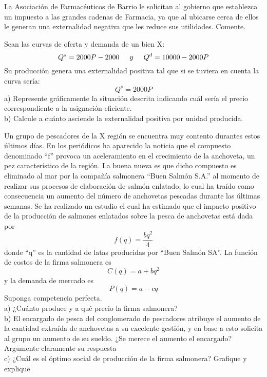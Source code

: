 \documentclass[addpoints,answers]{exam}
\begin{document}
\begin{questions}

\question La Asociación de Farmacéuticos de Barrio le solicitan al gobierno que establezca un impuesto
a las grandes cadenas de Farmacia, ya que al ubicarse cerca de ellos le generan una externalidad
negativa que les reduce sus utilidades. Comente.


\question Sean las curvas de oferta y demanda de un bien X:
\[Q^{s} = 2000P - 2000 \hspace{0.5cm}  y \hspace{0.5cm} Q^{d} = 10000 - 2000P\] \hfill \break
Su producción genera una externalidad positiva tal que si se tuviera en cuenta la curva sería: 
\hspace{0.5cm} \[Q^{s} = 2000P\] \hfill \break
a) Represente gráficamente la situación descrita indicando cuál sería el precio
correspondiente a la asignación eficiente.
\\
b) Calcule a cuánto asciende la externalidad positiva por unidad producida.


\question Un grupo de pescadores de la X región se encuentra muy contento durantes estos
últimos días. En los periódicos ha aparecido la noticia que el compuesto denominado
“f” provoca un aceleramiento en el crecimiento de la anchoveta, un pez característico
de la región. La buena nueva es que dicho compuesto es eliminado al mar por la
compañía salmonera “Buen Salmón S.A.” al momento de realizar sus procesos de
elaboración de salmón enlatado, lo cual ha traído como consecuencia un aumento del
número de anchovetas pescadas durante las últimas semanas. Se ha realizado un
estudio el cual ha estimado que el impacto positivo de la producción de salmones
enlatados sobre la pesca de anchovetas está dada por
 \[f(q) = \frac{bq^2}{4}\] donde “q” es la
cantidad de latas producidas por “Buen Salmón SA”. La función de costos de la firma
salmonera es \[C(q) = a + bq^2\] y la demanda de mercado es \[P(q) = a - cq\] Suponga competencia perfecta.
\\

a) ¿Cuánto produce y a qué precio la firma salmonera?
\\
b) El encargado de pesca del conglomerado de pescadores atribuye el aumento de la
cantidad extraída de anchovetas a su excelente gestión, y en base a esto solicita al
grupo un aumento de su sueldo. ¿Se merece el aumento el encargado? Argumente
claramente su respuesta
\\
c) ¿Cuál es el óptimo social de producción de la firma salmonera? Grafique y explique





\end{questions}
\end{document}
